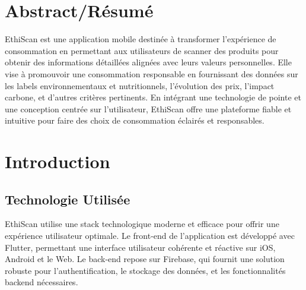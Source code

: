 \documentclass[11pt]{article}
\begin{document}


\clearpage\maketitle %
\setcounter{page}{0}
\thispagestyle{empty} %
\newpage

\tableofcontents
\newpage


\section*{Abstract/Résumé}

EthiScan est une application mobile destinée à transformer l'expérience de consommation en permettant aux utilisateurs de scanner des produits pour obtenir des informations détaillées alignées avec leurs valeurs personnelles. Elle vise à promouvoir une consommation responsable en fournissant des données sur les labels environnementaux et nutritionnels, l'évolution des prix, l'impact carbone, et d'autres critères pertinents. En intégrant une technologie de pointe et une conception centrée sur l'utilisateur, EthiScan offre une plateforme fiable et intuitive pour faire des choix de consommation éclairés et responsables.


\section{Introduction}

\subsection{Technologie Utilisée}

EthiScan utilise une stack technologique moderne et efficace pour offrir une expérience utilisateur optimale. Le front-end de l'application est développé avec Flutter, permettant une interface utilisateur cohérente et réactive sur iOS, Android et le Web. Le back-end repose sur Firebase, qui fournit une solution robuste pour l'authentification, le stockage des données, et les fonctionnalités backend nécessaires.
\end{document}

